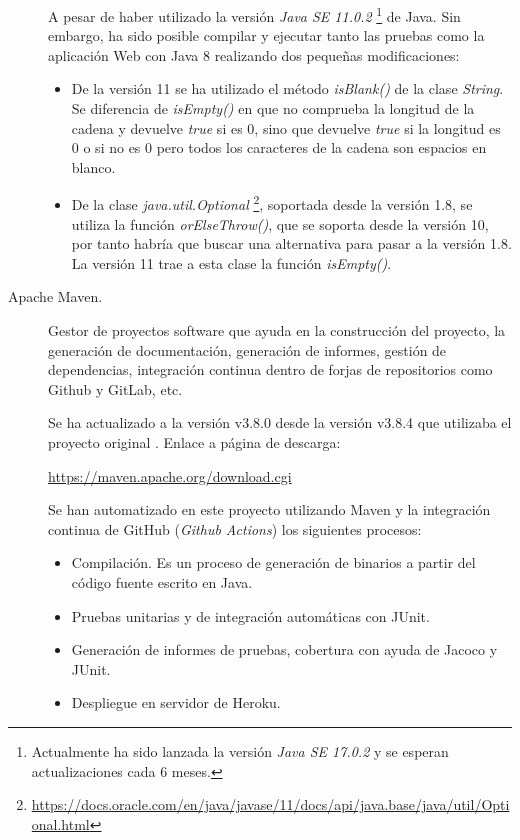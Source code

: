 \begin{description}
		A pesar de haber utilizado la versión \textit{Java SE 11.0.2} \footnote{Actualmente ha sido lanzada la versión \textit{Java SE 17.0.2} y se esperan actualizaciones cada 6 meses.} de Java. Sin embargo, ha sido posible compilar y ejecutar tanto las pruebas como la aplicación Web con Java 8 realizando dos pequeñas modificaciones:
		\begin{itemize}
			\item De la versión 11 se ha utilizado el método \textit{isBlank()} de la clase \textit{String}. Se diferencia de \textit{isEmpty()} en que no comprueba la longitud de la cadena y devuelve \textit{true} si es 0, sino que devuelve \textit{true} si la longitud es 0 o si no es 0 pero todos los caracteres de la cadena son espacios en blanco.
			\item De la clase \textit{java.util.Optional} \footnote{\url{https://docs.oracle.com/en/java/javase/11/docs/api/java.base/java/util/Optional.html}}, soportada desde la versión 1.8, se utiliza la función \textit{orElseThrow()}, que se soporta desde la versión 10, por tanto habría que buscar una alternativa para pasar a la versión 1.8. La versión 11 trae a esta clase la función \textit{isEmpty()}.
		\end{itemize}
	\item[Apache Maven.] Gestor de proyectos software que ayuda en la construcción del proyecto, la generación de documentación, generación de informes, gestión de dependencias, integración continua dentro de forjas de repositorios como Github y GitLab, etc. 
	
		Se ha actualizado a la versión v3.8.0 desde la versión  v3.8.4 que utilizaba el proyecto original \cite{TFGPrevio}. Enlace a página de descarga:
		
		\url{https://maven.apache.org/download.cgi}
		
		Se han automatizado en este proyecto utilizando Maven y la integración continua de GitHub (\textit{Github Actions}) los siguientes procesos:
		\begin{itemize}
			\item Compilación. Es un proceso de generación de binarios a partir del código fuente escrito en Java.
			\item Pruebas unitarias y de integración automáticas con JUnit.
			\item Generación de informes de pruebas, cobertura con ayuda de Jacoco y JUnit.
			\item Despliegue en servidor de Heroku.
		\end{itemize}
	

\end{description}
